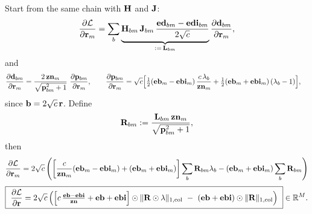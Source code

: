 \documentclass{article}
\begin{document}
Start from the same chain with $\v{H}$ and $\v{J}$:
\[
\ddfrac{\mathcal{L}}{\v{r}{m}}
= \sum_b \underbrace{\v{H}{bm}\,\v{J}{bm}\,\frac{\v{ed}{bm}-\v{edi}{bm}}{2\sqrt{c}}}_{:=\,\v{L}{bm}}
\ddfrac{\v{d}{bm}}{\v{r}{m}},
\]
and
\begin{align}
\ddfrac{\v{d}{bm}}{\v{r}{m}}
&= \frac{2\,\v{zn}{m}}{\sqrt{\v{p}{bm}^2+1}}\ \ddfrac{\v{p}{bm}}{\v{r}{m}},\qquad
\ddfrac{\v{p}{bm}}{\v{r}{m}}
= \sqrt{c}\Big[\tfrac12(\v{eb}{m}-\v{ebi}{m})\,\frac{c\,\lambda_b}{\v{zn}{m}}
+ \tfrac12(\v{eb}{m}+\v{ebi}{m})\,(\lambda_b-1)\Big],
\end{align}
since $\v{b}=2\sqrt{c}\,\v{r}$. Define
\[
\v{R}{bm}:=\frac{\v{L}{bm}\,\v{zn}{m}}{\sqrt{\v{p}{bm}^2+1}},
\]
then
\[
\ddfrac{\mathcal{L}}{\v{r}{m}}
= 2\sqrt{c}\left(
\left[\frac{c}{\v{zn}{m}}(\v{eb}{m}-\v{ebi}{m}) + (\v{eb}{m}+\v{ebi}{m})\right]\sum_b \v{R}{bm}\lambda_b
- (\v{eb}{m}+\v{ebi}{m})\sum_b \v{R}{bm}
\right)
\]
\[
\boxed{\ \ddfrac{\mathcal{L}}{\v{r}} =
2\sqrt{c}\left(
\Big[c\,\tfrac{\v{eb}-\v{ebi}}{\v{zn}}+\v{eb}+\v{ebi}\Big]\had \colnorm{\v{R}\had\v{\lambda}}
\ -\ (\v{eb}+\v{ebi})\had \colnorm{\v{R}}
\right)\ }\in\mathbb{R}^{M}.
\]
\end{document}
